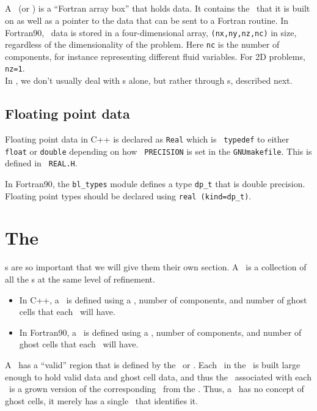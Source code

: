 \subsection{\FArrayBox}

A \FArrayBox\ (or \Fab) is a ``Fortran array box'' that holds data.  It contains the
\BoxType\ that it is built on as well as a pointer to the data 
that can be sent to a Fortran routine.
In Fortran90, \Fab\ data is stored in a four-dimensional array,
{\tt (nx,ny,nz,nc)} in size, regardless of the dimensionality of the
problem.  Here {\tt nc} is the number of components, for instance
representing different fluid variables.  For 2D problems, {\tt nz=1}.\\

In \BoxLib, we don't usually deal with 
\Fab s alone, but rather through \MultiFab s, described next.

\subsection{Floating point data}

Floating point data in C++ is declared as {\tt Real} which is {\tt
typedef} to either {\tt float} or {\tt double} depending on how {\tt
PRECISION} is set in the {\tt GNUmakefile}.  This is defined in {\tt
REAL.H}.

In Fortran90, the {\tt bl\_types} module defines a type {\tt dp\_t} that
is double precision.  Floating point types should be declared using
{\tt real (kind=dp\_t)}.


\section{The \MultiFab}
\MultiFab s are so important that we will give them their own section.
A \MultiFab\ is a collection of all the \Fab s at the same level of
refinement.
\begin{itemize}
\item In C++, a \MultiFab\ is defined using a \BoxArray,
number of components, and number of ghost cells that each \Fab\
will have.
\item In Fortran90, a \MultiFab\ is defined using a \layout,
number of components, and number of ghost cells that each \Fab\
will have.
\end{itemize}
A \MultiFab\ has a ``valid'' region that is defined by 
the \BoxArray~or \layout.  Each \Fab\ in the \MultiFab\ is built large enough 
to hold valid data and ghost cell data, and thus the \BoxType\ associated with
each \Fab\ is a grown version of the corresponding \BoxType\ from the \BoxArray.
Thus, a \Fab\ has no concept 
of ghost cells, it merely has a single \BoxType\ that identifies it.\\

